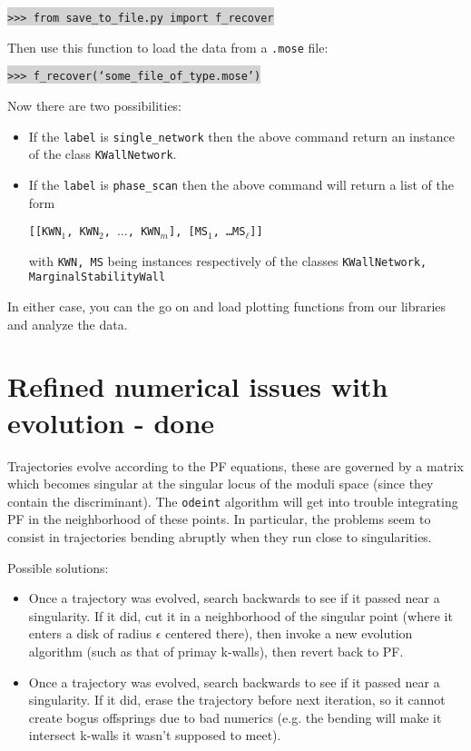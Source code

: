 \documentclass[11pt]{report}
\begin{document}
\smallskip

\indent \colorbox{lightgray}{\tt>>> from save\_to\_file.py import f\_recover}

\smallskip

\noindent Then use this function to load the data from a {\tt *.mose} file:

\smallskip

\indent \colorbox{lightgray}{\tt>>> f\_recover(`some\_file\_of\_type.mose')}

\bigskip

\noindent Now there are two possibilities: 
\begin{itemize}
	\item If the {\tt label} is {\tt single\_network} then the above command return an instance of the class {\tt KWallNetwork}.
	\item If the  {\tt label} is {\tt phase\_scan} then the above command will return a list of the form\\
	\begin{center}  {\tt [[KWN${}_{1}$, KWN${}_{2}$, $\dots$, KWN${}_{m}$], [MS${}_{1}$, \dots MS${}_{\ell}$]]}  \end{center}
	with {\tt KWN, MS} being instances respectively of the classes {\tt KWallNetwork, MarginalStabilityWall}
\end{itemize}

In either case, you can the go on and load plotting functions from our libraries and analyze the data.


\section{Refined numerical issues with evolution  - {\color{red} \bf done}}
Trajectories evolve according to the PF equations, these are governed by a matrix which becomes singular at the singular locus of the moduli space (since they contain the discriminant).
The {\texttt{odeint}} algorithm will get into trouble integrating PF in the neighborhood of these points.
In particular, the problems seem to consist in trajectories bending abruptly when they run close to singularities.

\medskip

\noindent Possible solutions:
\begin{itemize}
	\item Once a trajectory was evolved, search backwards to see if it passed near a singularity. If it did, cut it in a neighborhood of the singular point (where it enters a disk of radius $\epsilon$ centered there), then invoke a new evolution algorithm (such as that of primay k-walls), then revert back to PF.
	\item Once a trajectory was evolved, search backwards to see if it passed near a singularity. If it did, erase the trajectory before next iteration, so it cannot create bogus offsprings due to bad numerics (e.g. the bending will make it intersect k-walls it wasn't supposed to meet).
\end{itemize}
\end{document}
